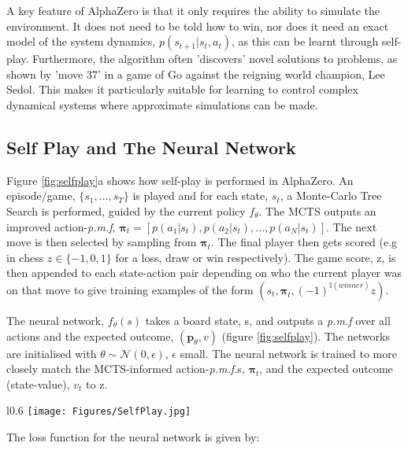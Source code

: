 \documentclass[main.tex]{subfiles}
\begin{document}
A key feature of AlphaZero is that it only requires the ability to simulate the environment. It does not need to be told how to win, nor does it need an exact model of the system dynamics, $p(s_{t+1} |s_t, a_t)$, as this can be learnt through self-play. Furthermore, the algorithm often 'discovers' novel solutions to problems, as shown by 'move 37' in a game of Go against the reigning world champion, Lee Sedol. This makes it particularly suitable for learning to control complex dynamical systems where approximate simulations can be made.

\subsection{Self Play and The Neural Network}

Figure \ref{fig:selfplay}a
shows how self-play is performed in AlphaZero. An episode/game, $\{s_1, ..., s_T\}$ is played and for each state, $s_t$, a Monte-Carlo Tree Search is performed, guided by the current policy $f_\theta$. The MCTS outputs an improved action-\textit{p.m.f}, $\boldsymbol{\pi}_t = [p(a_1|s_t), p(a_2|s_t), ..., p(a_N|s_t)]$. The next move is then selected by sampling from $\boldsymbol{\pi}_t$. The final player then gets scored (e.g in chess $z \in \{-1, 0, 1\} $ for a loss, draw or win respectively). The game score, z, is then appended to each state-action pair depending on who the current player was on that move to give training examples of the form $(s_t, \boldsymbol{\pi}_t, (-1)^{\mathbb{I}(winner)}z)$. 

The neural network, $f_\theta(s)$ takes a board state, s, and outputs a \textit{p.m.f} over all actions and the expected outcome, $(\boldsymbol{p}_\theta, v)$ (figure \ref{fig:selfplay}). The networks are initialised with $\theta \sim \mathcal{N}(0, \epsilon)$, $\epsilon$ small. The neural network is trained to more closely match the MCTS-informed action-\textit{p.m.f.}s, $\boldsymbol{\pi}_t$, and the expected outcome (state-value), $v_t$ to z.

\begin{wrapfigure}{l}{0.6\textwidth}
   \centering
   \texttt{[image: Figures/SelfPlay.jpg]}
   \caption{A schematic showing how self-play and policy training are performed. Taken from \cite{AlphaGoZero}.}
   \label{fig:selfplay}
   \vspace{0.5cm}
\end{wrapfigure}

The loss function for the neural network is given by:
\end{document}
